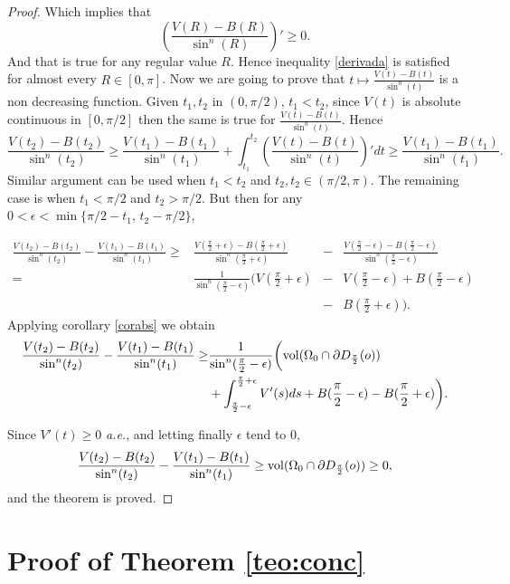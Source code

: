 \documentclass{amsart}
\theoremstyle{definition}
\theoremstyle{remark}
\begin{document}
\begin{proof}
Which implies that
\begin{equation}\label{derivada}
    \left(\frac{V(R)-B(R)}{\sin^n(R)}\right)'\geq 0.
\end{equation}
And that is true for any regular value $R$. Hence inequality \eqref{derivada} is satisfied for almost every $R\in[0,\pi]$. Now we are going to prove that $t\mapsto \frac{V(t)-B(t)}{\sin^n(t)}$ is a non decreasing function. Given $t_1,t_2$ in $(0,\pi/2)$, $t_1<t_2$, since   $V(t)$ is absolute continuous in $[0,\pi/2]$ then the same is true for $\frac{V(t)-B(t)}{\sin^n(t)}$. Hence
$$
\frac{V(t_2)-B(t_2)}{\sin^n(t_2)}\geq \frac{V(t_1)-B(t_1)}{\sin^n(t_1)}+\int_{t_1}^{t_2}\left(\frac{V(t)-B(t)}{\sin^n(t)}\right)'dt\geq \frac{V(t_1)-B(t_1)}{\sin^n(t_1)}.
$$
Similar argument can be used when $t_1<t_2$ and $t_2,t_2\in (\pi/2,\pi)$. The remaining case is when $t_1<\pi/2$ and $t_2>\pi/2$. But then for any $0<\epsilon<\min\{ \pi/2-t_1,\, t_2-\pi/2\}$,

$$
\begin{array}{rrcl}
\frac{V(t_2)-B(t_2)}{\sin^n(t_2)}- \frac{V(t_1)-B(t_1)}{\sin^n(t_1)}\geq &\frac{V(\frac{\pi}{2}+\epsilon)-B(\frac{\pi}{2}+\epsilon)}{\sin^n(\frac{\pi}{2}+\epsilon)} &- &\frac{V(\frac{\pi}{2}-\epsilon)-B(\frac{\pi}{2}-\epsilon)}{\sin^n(\frac{\pi}{2}-\epsilon)}\\
=&\frac{1}{\sin^n(\frac{\pi}{2}-\epsilon)}\bigg(V(\frac{\pi}{2}+\epsilon)&-&V(\frac{\pi}{2}-\epsilon)  +B(\frac{\pi}{2}-\epsilon)\\& &-&B(\frac{\pi}{2}+\epsilon)\bigg).
\end{array}
$$
Applying corollary \ref{corabs} we obtain 
$$
\begin{aligned}
\frac{V(t_2)-B(t_2)}{\sin^n(t_2)}- \frac{V(t_1)-B(t_1)}{\sin^n(t_1)}\geq &\frac{1}{\sin^n(\frac{\pi}{2}-\epsilon)}\bigg(     {\rm vol}(\Omega_0\cap \partial D_{\frac{\pi}{2}}(o))\\ &+\int_{\frac{\pi}{2}-\epsilon}^{\frac{\pi}{2}
+\epsilon}V'(s) ds +B(\frac{\pi}{2}-\epsilon)-B(\frac{\pi}{2}+\epsilon)\bigg).
\end{aligned}
$$

Since $V'(t)\geq 0$ \emph{a.e.}, and letting finally $\epsilon$ tend to $0$, 
$$
\frac{V(t_2)-B(t_2)}{\sin^n(t_2)}- \frac{V(t_1)-B(t_1)}{\sin^n(t_1)}\geq{\rm vol}(\Omega_0\cap \partial D_{\frac{\pi}{2}}(o))\geq 0,
$$
and the theorem is proved.
\end{proof}

\section{Proof of Theorem \ref{teo:conc}}
\end{document}
